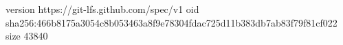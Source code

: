version https://git-lfs.github.com/spec/v1
oid sha256:466b8175a3054c8b053463a8f9e78304fdac725d11b383db7ab83f79f81cf022
size 43840
